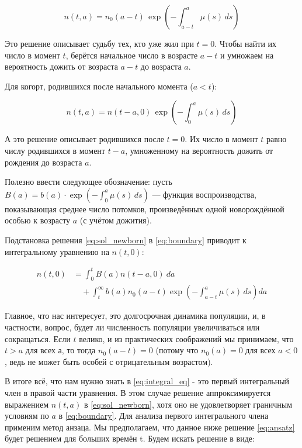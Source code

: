 \documentclass[a4paper, 14pt]{extarticle}
\begin{document}
\begin{equation}
n(t, a) = n_0(a - t) \, \exp\left( -\int_{a-t}^{a} \mu(s) \, ds \right)
\label{eq:sol_existing}
\end{equation}

Это решение описывает судьбу тех, кто уже жил при \( t = 0 \). Чтобы найти их число в момент \( t \), берётся начальное число в возрасте \( a - t \) и умножаем на вероятность дожить от возраста \( a-t \) до возраста \( a \).

Для когорт, родившихся после начального момента (\( a < t \)):

\begin{equation}
n(t, a) = n(t - a, 0) \, \exp\left( -\int_{0}^{a} \mu(s) \, ds \right)
\label{eq:sol_newborn}
\end{equation}

А это решение описывает родившихся после \( t = 0 \). Их число в момент \( t \) равно числу родившихся в момент \( t - a \), умноженному на вероятность дожить от рождения до возраста \( a \). 

Полезно ввести следующее обозначение: пусть $B(a) = b(a) \cdot \exp\left(-\int_0^a \mu(s)\, ds\right)$ — функция воспроизводства, показывающая среднее число потомков, произведённых одной новорождённой особью к возрасту $a$ (с учётом дожития).

Подстановка решения \eqref{eq:sol_newborn} в \eqref{eq:boundary} приводит к интегральному уравнению на \( n(t, 0) \):

\begin{align}
n(t, 0) &= \int_{0}^{t} B(a)  n(t - a, 0)  \ da \nonumber \\
        &\quad + \int_{t}^{\infty} b(a) n_0(a - t) \exp\left( -\int_{a-t}^{a} \mu(s) \, ds \right) da
\label{eq:integral_eq}
\end{align}

Главное, что нас интересует, это долгосрочная динамика популяции, и, в частности, вопрос, будет ли численность популяции увеличиваться или сокращаться. Если $t$ велико, и из практических соображений мы принимаем, что $t > a$ для всех $а$, то тогда $n_0(a - t) = 0$ (потому что $n_0(a) = 0$ для всех $a < 0$, ведь не может быть особей с отрицательным возрастом).

В итоге всё, что нам нужно знать в \eqref{eq:integral_eq} - это первый интегральный член в правой части уравнения. В этом случае решение аппроксимируется выражением $n(t, a)$ в \eqref{eq:sol_newborn}, хотя оно не удовлетворяет граничным условиям по $a$ в \eqref{eq:boundary}. Для анализа первого интегрального члена применим метод анзаца. Мы предполагаем, что данное ниже решение \eqref{eq:ansatz} будет решением для больших времён t. Будем искать решение в виде:
\end{document}
